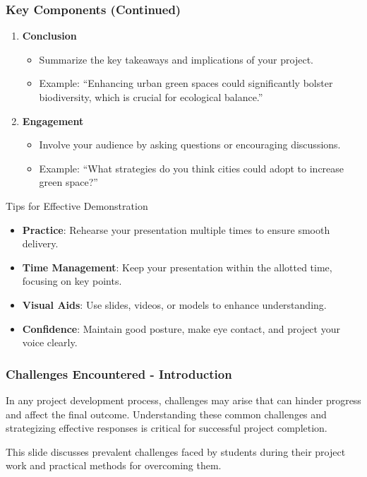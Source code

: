 \documentclass[aspectratio=169]{beamer}
\begin{document}
\begin{frame}[fragile]
    \frametitle{Key Components (Continued)}
    \begin{enumerate}[resume]
        \item \textbf{Conclusion}
        \begin{itemize}
            \item Summarize the key takeaways and implications of your project.
            \item Example: ``Enhancing urban green spaces could significantly bolster biodiversity, which is crucial for ecological balance.''
        \end{itemize}

        \item \textbf{Engagement}
        \begin{itemize}
            \item Involve your audience by asking questions or encouraging discussions.
            \item Example: ``What strategies do you think cities could adopt to increase green space?''
        \end{itemize}
    \end{enumerate}
    
    \begin{block}{Tips for Effective Demonstration}
        \begin{itemize}
            \item \textbf{Practice}: Rehearse your presentation multiple times to ensure smooth delivery.
            \item \textbf{Time Management}: Keep your presentation within the allotted time, focusing on key points.
            \item \textbf{Visual Aids}: Use slides, videos, or models to enhance understanding.
            \item \textbf{Confidence}: Maintain good posture, make eye contact, and project your voice clearly.
        \end{itemize}
    \end{block}
\end{frame}

\begin{frame}[fragile]
    \frametitle{Challenges Encountered - Introduction}
    In any project development process, challenges may arise that can hinder progress and affect the final outcome. 
    Understanding these common challenges and strategizing effective responses is critical for successful project completion.
    
    This slide discusses prevalent challenges faced by students during their project work and practical methods for overcoming them.
\end{frame}
\end{document}
